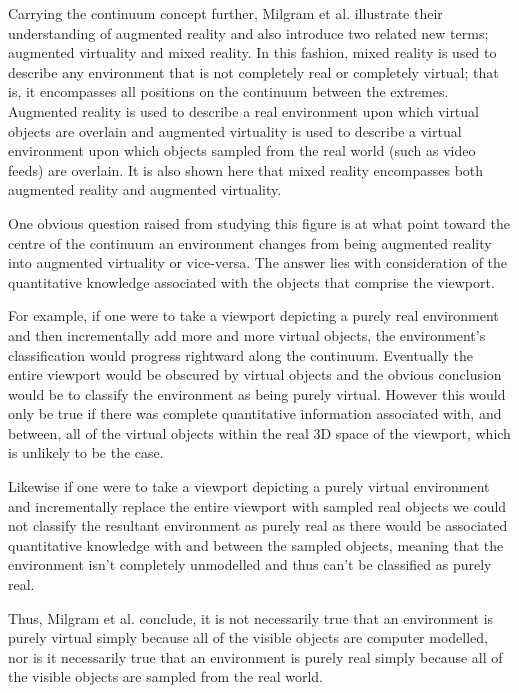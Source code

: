 Carrying the continuum concept further, Milgram et al. illustrate their understanding of augmented reality and also introduce two related new terms; augmented virtuality and mixed reality. In this fashion, mixed reality is used to describe any environment that is not completely real or completely virtual; that is, it encompasses all positions on the continuum between the extremes. Augmented reality is used to describe a real environment upon which virtual objects are overlain and augmented virtuality is used to describe a virtual environment upon which objects sampled from the real world (such as video feeds) are overlain. It is also shown here that mixed reality encompasses both augmented reality and augmented virtuality.

One obvious question raised from studying this figure is at what point toward the centre of the continuum an environment changes from being augmented reality into augmented virtuality or vice-versa. The answer lies with consideration of the quantitative knowledge associated with the objects that comprise the viewport.

For example, if one were to take a viewport depicting a purely real environment and then incrementally add more and more virtual objects, the environment's classification would progress rightward along the continuum. Eventually the entire viewport would be obscured by virtual objects and the obvious conclusion would be to classify the environment as being purely virtual. However this would only be true if there was complete quantitative information associated with, and between, all of the virtual objects within the real 3D space of the viewport, which is unlikely to be the case.

Likewise if one were to take a viewport depicting a purely virtual environment and incrementally replace the entire viewport with sampled real objects we could not classify the resultant environment as purely real as there would be associated quantitative knowledge with and between the sampled objects, meaning that the environment isn't completely unmodelled and thus can't be classified as purely real.

Thus, Milgram et al. conclude, it is not necessarily true that an environment is purely virtual simply because all of the visible objects are computer modelled, nor is it necessarily true that an environment is purely real simply because all of the visible objects are sampled from the real world.


